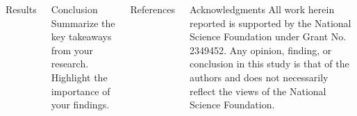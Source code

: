 \documentclass[20pt]{beamer}
\begin{document}
\begin{frame}[t]
\begin{columns}[t]
\begin{block}{Results}
\begin{table}[!t]
      \label{tab:bigpatent}
    \end{table}
  \end{block}


  \begin{block}{Conclusion}
    Summarize the key takeaways from your research. 
    Highlight the importance of your findings.
  \end{block}

  \begin{block}{References}
    \small
  \end{block}

  \begin{block}{Acknowledgments}
    All work herein reported is supported by the National Science Foundation under Grant No. 2349452.
    Any opinion, finding, or conclusion in this study is that of the authors and does not necessarily reflect the views of the National Science Foundation.
  \end{block}
\end{columns}

\end{frame}
\end{document}
